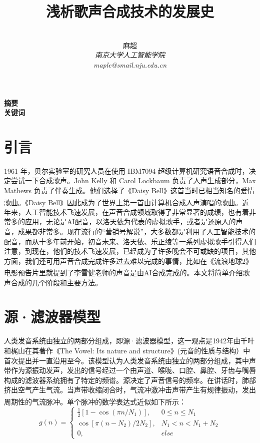 \documentclass[12pt,a4paper]{ctexart}
\title{\textbf{浅析歌声合成技术的发展史}}
\author{
\\
\Large{麻超 \quad 201300066}
\\[6pt]
{ \large \textit{南京大学人工智能学院}}\\[2pt]\large \textit{maple@smail.nju.edu.cn}
}
\date{}
\newcommand{\supercite}[1]{\textsuperscript{\cite{#1}}}
\begin{document}
\maketitle
\setcounter{page}{1}
\textbf{摘要}  \\

\textbf{关键词}
\\[60pt]
\section{引言}
1961 年，贝尔实验室的研究人员在使用 IBM7094 超级计算机研究语音合成时，决定尝试一下合成歌声。John Kelly 和 Carol Lockbaum 负责了人声生成部分，Max Mathews 负责了伴奏生成。他们选择了《Daisy Bell》这首当时已相当知名的爱情歌曲。《Daisy Bell》因此成为了世界上第一首由计算机合成人声演唱的歌曲\supercite{1}。近年来，人工智能技术飞速发展，在声音合成领域取得了非常显著的成绩，也有着非常多的应用，无论是AI配音，以洛天依为代表的虚拟歌手，或者是还原人的声音，成果都非常多。现在流行的“营销号解说”，大多数都是利用了人工智能技术的配音，而从十多年前开始，初音未来、洛天依、乐正绫等一系列虚拟歌手引得人们注意，到现在，他们的技术飞速发展，已经成为了许多晚会不可或缺的项目，其他方面，我们还可用声音合成完成许多过去难以完成的事情，比如在《流浪地球2》电影预告片里就提到了李雪健老师的声音是由AI合成完成的\supercite{2}。本文将简单介绍歌声合成的几个阶段和主要方法。

\section{源·滤波器模型}
人类发音系统由独立的两部分组成，即源·滤波器模型，这一观点是1942年由千叶和梶山在其著作《The Vowel: Its nature and structure》(元音的性质与结构）中首次提出并一直沿用至今。该模型认为人类发音系统由独立的两部分组成，其中声带作为源振动发声，发出的信号经过一个由声道、喉咙、口腔、鼻腔、牙齿与嘴唇构成的滤波器系统拥有了特定的频谱。源决定了声音信号的频率。在讲话时，肺部挤出空气产生气流。当声带收缩闭合时，气流冲激冲击声带产生有规律振动，发出周期性的气流脉冲\supercite{3}。单个脉冲的数学表达式近似如下所示：
\begin{equation}
    g(n)=
    \begin{cases}
        \frac{1}{2}[1-\cos(\pi n/N_1)], & 0\leq n\leq N_1 \\
        \cos [\pi(n-N_2)/2N_2],         & N_1<n<N_1+N_2   \\
        0,                              & else
    \end{cases}
\end{equation}
\end{document}
